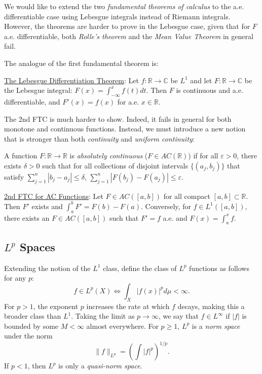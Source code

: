 \documentclass[12pt]{article}
\begin{document}
We would like to extend the two {\it fundamental theorems of calculus} to the
a.e. differentiable case using Lebesgue integrals instead of Riemann integrals.
However, the theorems are harder to prove in the Lebesgue case, given that for 
$F$ a.e. differentiable, both {\it Rolle's theorem} and the 
{\it Mean Value Theorem} in general fail.

The analogue of the first fundamental theorem is:

\hangindent 12pt
\underline{The Lebesgue Differentiation Theorem}:
Let $f : \mathbb{R}\rightarrow\mathbb{C}$ be $L^1$ and let 
$F : \mathbb{R}\rightarrow\mathbb{C}$ be the Lebesgue integral:
$F(x) = \int_{-\infty}^x f(t) dt$.
Then $F$ is continuous and a.e. differentiable, and $F'(x) = f(x)$ for
a.e. $x\in\mathbb{R}$.

The 2nd FTC is much harder to show.
Indeed, it fails in general for both monotone and continuous functions.
Instead, we must introduce a new notion that is stronger than both 
{\it continuity} and {\it uniform continuity}:

A function $F : \mathbb{R} \rightarrow \mathbb{R}$ is 
{\it absolutely continuous} ($F\in AC(\mathbb{R})$) if 
for all $\varepsilon >0$, there exists $\delta > 0$ such that
for all collections of disjoint intervals $\{(a_j, b_j)\}$ that satisfy
$\sum_{j=1}^n |b_j - a_j| \leq \delta$,
$\sum_{j=1}^n |F(b_j) - F(a_j)| \leq \varepsilon$.

\hangindent 12pt
\underline{2nd FTC for AC Functions}:
Let $F \in AC([a,b])$ for all compact $[a,b] \subset \mathbb{R}$.
Then $F'$ exists and $\int_a^b F' = F(b) - F(a)$.
Conversely, for $f \in L^1([a,b])$, there exists an $F \in AC([a,b])$
such that $F' = f$ a.e. and $F(x) = \int_a^x f$.

\subsection*{$L^p$ Spaces}

Extending the notion of the $L^1$ class, define the class of $L^p$ functions
as follows for any $p$:
$$
f \in L^p(X) \iff \int_X |f(x)|^p d\mu < \infty.
$$
For $p > 1$, the exponent $p$ increases the rate at which $f$ decays, making
this a broader class than $L^1$.
Taking the limit as $p \rightarrow \infty$, we say that $f\in L^\infty$
if $|f|$ is bounded by some $M < \infty$ almost everywhere.
For $p \geq 1$, $L^p$ is a {\it norm space} under the norm 
$$
\|f\|_{L^p} = \left(\int |f|^p \right)^{1/p}.
$$
If $p < 1$, then $L^p$ is only a {\it quasi-norm space}.
\end{document}
